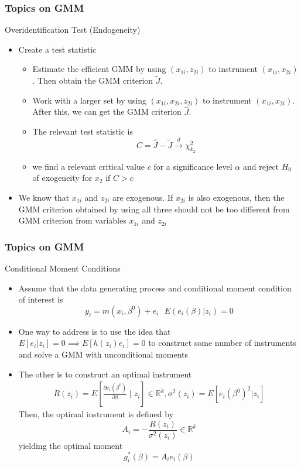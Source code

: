 \documentclass{beamer}
\begin{document}
\begin{frame}
\frametitle{Topics on GMM}
Overidentification Test (Endogeneity)
\begin{itemize}
\item Create a test statistic
\begin{itemize}
\item Estimate the efficient GMM by using $(x_{1i}, z_{2i})$ to instrument $(x_{1i}, x_{2i})$. Then obtain the GMM criterion $\tilde{J}$. 
\item Work with a larger set by using $(x_{1i}, x_{2i}, z_{2i})$ to instrument $(x_{1i}, x_{2i})$. After this, we can get the GMM criterion $\widehat{J}$. 
\item The relevant test statistic is
\[
C = \widehat{J}-\tilde{J} \xrightarrow{d} \chi^2_{k_2}
\]
\item we find a relevant critical value $c$ for a significance level $\alpha$ and reject $H_0$ of exogeneity for $x_2$ if $C>c$
\end{itemize}
\item  We know that $x_{1i}$ and $z_{2i}$ are exogenous. If $x_{2i}$ is also exogenous, then the GMM criterion obtained by using all three should not be too different from GMM criterion from variables $x_{1i}$ and $z_{2i}$
\end{itemize}
\end{frame}

\begin{frame}
\frametitle{Topics on GMM}
Conditional Moment Conditions
\begin{itemize}
\item  Assume that the data generating process and conditional moment condition of interest is
\[ 
y_i =m( x_i,\beta^0 )+ e_i \ \ \ E(e_i(\beta)|z_i)=0
\]
\item One way to address is to use the idea that $E[e_i|z_i]=0\implies E[h(z_i)e_i]=0$ to construct some number of instruments and solve a GMM with unconditional moments
\item The other is to construct an optimal instrument
\begin{gather*}
R(z_i) = E\left[\frac{\partial e_i(\beta^0)}{\partial \beta}\mid z_i\right] \in\mathbb{R}^k, \sigma^2(z_i) = E[e_i(\beta^0)^2|z_i]
\end{gather*}
Then, the optimal instrument is defined by
\[
A_i = -\frac{R(z_i)}{\sigma^2(z_i)}\in\mathbb{R}^k
\]
yielding the optimal moment
\[
g^*_i(\beta) = A_i e_i(\beta)
\]
\end{itemize}
\end{frame}
\end{document}
